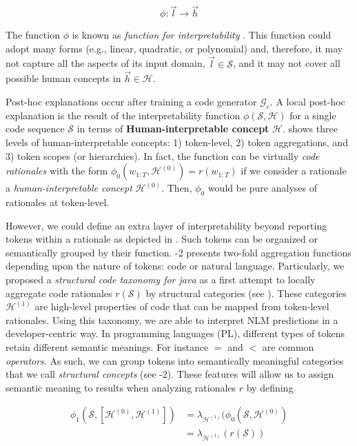 \begin{equation}
\phi: \Vec{l} \to \Vec{h}
\label{eq:kim}
\end{equation}

The function $\phi$ is known as \textit{function for interpretability} \citep{Kim2018InterpretabilityTCAV}. This function could adopt many forms (e.g., linear, quadratic, or polynomial) and, therefore, it may not capture all the aspects of its input domain, $\Vec{l} \in \mathcal{S}$, and it may not cover all possible human concepts in $\Vec{h} \in \mathcal{H}$. 

Post-hoc explanations occur after training a code generator $\mathcal{G}_c$. A local post-hoc explanation is the result of the interpretability function $\phi(\mathcal{S},\mathcal{H})$ for a single code sequence $\mathcal{S}$ in terms of \textbf{Human-interpretable concept} $\mathcal{H}$.  shows three levels of human-interpretable concepts: 1) token-level, 2) token aggregations, and 3) token scopes (or hierarchies). In fact, the function  can be virtually \textit{code rationales} with the form $\phi_0(w_{1:T}, \mathcal{H}^{(0)}) = r(w_{1:T})$ if we consider a rationale a \textit{human-interpretable concept} $\mathcal{H}^{(0)}$. Then, $\phi_0$ would be pure analyses of rationales at token-level. 

However, we could define an extra layer of interpretability beyond reporting tokens within a rationale as depicted in . Such tokens can be organized or semantically grouped by their function. -2 presents two-fold aggregation functions depending upon the nature of tokens: code or natural language. Particularly, we proposed a \textit{structural code taxonomy for java} as a first attempt to locally aggregate code rationales $r(\mathcal{S})$ by structural categories (see ). These categories $\mathcal{H}^{(1)}$ are high-level properties of code that can be mapped from token-level rationales. Using this taxonomy, we are able to interpret NLM predictions in a developer-centric way. In programming languages (PL), different types of tokens retain different semantic meanings. For instance $=$ and $<$ are common \textit{operators}. As such, we can group tokens into semantically meaningful categories that we call \textit{structural concepts} (see -2). These features will allow us to assign semantic meaning to results when analyzing rationales $r$ by defining 

\begin{equation}
\begin{split}
\phi_1(\mathcal{S}, [\mathcal{H}^{(0)},  \mathcal{H}^{(1)}])  & = \lambda_{\mathcal{H}^{(1)} } ( \phi_0(\mathcal{S}, \mathcal{H}^{(0)} ) \\
                                                            & = \lambda_{\mathcal{H}^{(1)} } ( r(\mathcal{S}) )
\end{split}
\label{eq:structuralagg}
\end{equation}

